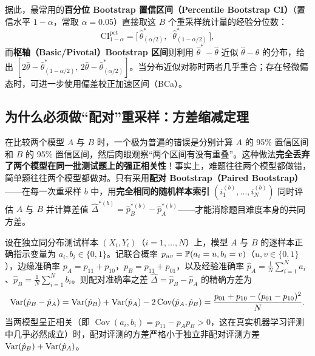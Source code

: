 据此，最常用的\textbf{百分位 Bootstrap 置信区间（Percentile Bootstrap CI）}（置信水平 $1-\alpha$，常取 $\alpha=0.05$）直接取这 $B$ 个重采样统计量的经验分位数：
\begin{equation}\label{eq:bootstrap-ci}
  \mathrm{CI}_{1-\alpha}^{\text{pct}} = \Big[\, \hat{\theta}^{*}_{(\alpha/2)},\;\; \hat{\theta}^{*}_{(1-\alpha/2)} \,\Big],
\end{equation}
而\textbf{枢轴（Basic/Pivotal）Bootstrap 区间}则利用 $\hat{\theta}^* - \hat{\theta}$ 近似 $\hat{\theta} - \theta$ 的分布，给出 $[2\hat{\theta} - \hat{\theta}^{*}_{(1-\alpha/2)},\, 2\hat{\theta} - \hat{\theta}^{*}_{(\alpha/2)}]$。当分布近似对称时两者几乎重合；存在轻微偏态时，可进一步使用偏差校正加速区间（BCa）。

\subsection{为什么必须做“配对”重采样：方差缩减定理}

在比较两个模型 $A$ 与 $B$ 时，一个极为普遍的错误是分别计算 $A$ 的 95\% 置信区间和 $B$ 的 95\% 置信区间，然后肉眼观察“两个区间有没有重叠”。这种做法\textbf{完全丢弃了两个模型在同一批测试题上的强正相关性}！事实上，难题往往两个模型都做错，简单题往往两个模型都做对。只有采用\textbf{配对 Bootstrap（Paired Bootstrap）}——在每一次重采样 $b$ 中，用\textbf{完全相同的随机样本索引} $(i_1^{(b)},\dots,i_N^{(b)})$ 同时评估 $A$ 与 $B$ 并计算差值 $\hat{\Delta}^{*(b)} = \hat{p}_B^{*(b)} - \hat{p}_A^{*(b)}$——才能消除题目难度本身的共同方差。

\begin{thmBox}
\begin{theorem}[配对评测的方差缩减定理]\label{thm:paired-var}
设在独立同分布测试样本 $(X_i, Y_i)$（$i=1,\dots,N$）上，模型 $A$ 与 $B$ 的逐样本正确指示变量为 $a_i, b_i \in \{0,1\}$。记联合概率 $p_{uv} = \mathbb{P}(a_i = u, b_i = v)$（$u,v \in \{0,1\}$），边缘准确率 $p_A = p_{11} + p_{10}$，$p_B = p_{11} + p_{01}$，以及经验准确率 $\hat{p}_A = \frac{1}{N}\sum_{i=1}^N a_i$、$\hat{p}_B = \frac{1}{N}\sum_{i=1}^N b_i$。则配对准确率之差 $\hat{\Delta} = \hat{p}_B - \hat{p}_A$ 的精确方差为
\begin{equation}\label{eq:paired-var}
  \operatorname{Var}(\hat{p}_B - \hat{p}_A)
  = \operatorname{Var}(\hat{p}_B) + \operatorname{Var}(\hat{p}_A) - 2\operatorname{Cov}(\hat{p}_A, \hat{p}_B)
  = \frac{p_{01} + p_{10} - (p_{01} - p_{10})^2}{N}.
\end{equation}
当两模型呈正相关（即 $\operatorname{Cov}(a_i, b_i) = p_{11} - p_A p_B > 0$，这在真实机器学习评测中几乎必然成立）时，配对评测的方差严格小于独立非配对评测方差 $\operatorname{Var}(\hat{p}_B) + \operatorname{Var}(\hat{p}_A)$。
\end{theorem}
\end{thmBox}

